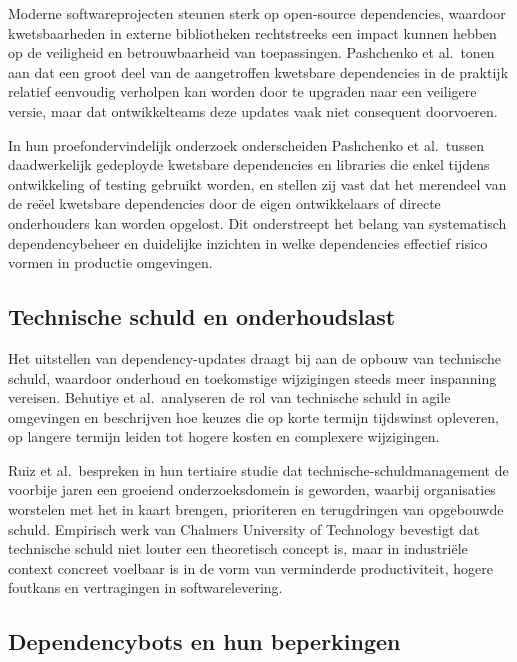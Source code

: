 Moderne softwareprojecten steunen sterk op open-source dependencies, waardoor kwetsbaarheden in externe bibliotheken rechtstreeks een impact kunnen hebben op de veiligheid en betrouwbaarheid van toepassingen.\autocite{Pashchenko2018} Pashchenko et al.\ tonen aan dat een groot deel van de aangetroffen kwetsbare dependencies in de praktijk relatief eenvoudig verholpen kan worden door te upgraden naar een veiligere versie, maar dat ontwikkelteams deze updates vaak niet consequent doorvoeren.\autocite{Pashchenko2018}

In hun proefondervindelijk onderzoek onderscheiden Pashchenko et al.\ tussen daadwerkelijk gedeployde kwetsbare dependencies en libraries die enkel tijdens ontwikkeling of testing gebruikt worden, en stellen zij vast dat het merendeel van de reëel kwetsbare dependencies door de eigen ontwikkelaars of directe onderhouders kan worden opgelost.\autocite{Pashchenko2018} Dit onderstreept het belang van systematisch dependencybeheer en duidelijke inzichten in welke dependencies effectief risico vormen in productie omgevingen.\autocite{Pashchenko2018}

\subsection{Technische schuld en onderhoudslast}

Het uitstellen van dependency-updates draagt bij aan de opbouw van technische schuld, waardoor onderhoud en toekomstige wijzigingen steeds meer inspanning vereisen.\autocite{Behutiye2024,Ruiz2024} Behutiye et al.\ analyseren de rol van technische schuld in agile omgevingen en beschrijven hoe keuzes die op korte termijn tijdswinst opleveren, op langere termijn leiden tot hogere kosten en complexere wijzigingen.\autocite{Behutiye2024}

Ruiz et al.\ bespreken in hun tertiaire studie dat technische-schuldmanagement de voorbije jaren een groeiend onderzoeksdomein is geworden, waarbij organisaties worstelen met het in kaart brengen, prioriteren en terugdringen van opgebouwde schuld.\autocite{Ruiz2024} Empirisch werk van Chalmers University of Technology bevestigt dat technische schuld niet louter een theoretisch concept is, maar in industriële context concreet voelbaar is in de vorm van verminderde productiviteit, hogere foutkans en vertragingen in softwarelevering.\autocite{Chalmers2020}

\subsection{Dependencybots en hun beperkingen}

